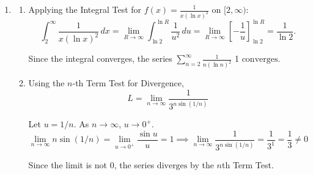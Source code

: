 \documentclass[a4paper, 12pt]{article}
\begin{document}
\begin{enumerate}[leftmargin=*,label=\textbf{\arabic*.}]
\begin{enumerate}[leftmargin=*,label=\textbf{\alph*.}]
Solving $|x-3| < 2$ yields $1 < x < 5$.

At $x = 1$: $\sum_{n=1}^{\infty} \frac{(-1)^n (-2)^n}{2^n \cdot n} = \sum_{n=1}^{\infty} \frac{1}{n}$, which is the harmonic series and diverges.

At $x = 5$: $\sum_{n=1}^{\infty} \frac{(-1)^n 2^n}{2^n \cdot n} = \sum_{n=1}^{\infty} \frac{(-1)^n}{n}$, which converges by the Alternating Series Test.

Therefore, the interval of convergence is $\boxed{(1, 5]}$.

\item \begin{enumerate}[leftmargin=*,label=\textbf{\roman*.}]
\item Applying the Integral Test for $f(x) = \frac{1}{x(\ln x)^2}$ on $[2, \infty)$:
\[\int_{2}^{\infty} \frac{1}{x(\ln x)^2} \, dx = \lim_{R \to \infty} \int_{\ln 2}^{\ln R} \frac{1}{u^2} \, du = \lim_{R \to \infty} \left[ -\frac{1}{u} \right]_{\ln 2}^{\ln R} = \frac{1}{\ln 2}.\]

Since the integral converges, the series $\sum_{n=2}^{\infty} \frac{1}{n(\ln n)^2}$ 1 $\boxed{\text{converges}}$.

\item Using the $n$-th Term Test for Divergence,
\[L = \lim_{n \to \infty} \frac{1}{3^{n \sin(1/n)}}\]

Let $u = 1/n$. As $n \to \infty$, $u \to 0^+$.
\[\lim_{n \to \infty} n \sin(1/n) = \lim_{u \to 0^+} \frac{\sin u}{u} = 1\implies \lim_{n \to \infty} \frac{1}{3^{n \sin(1/n)}} = \frac{1}{3^1} = \frac{1}{3} \ne 0\]

Since the limit is not 0, the series $\boxed{\text{diverges}}$ by the $n$th Term Test.
\end{enumerate}
\end{enumerate}
\end{enumerate}
\end{document}
